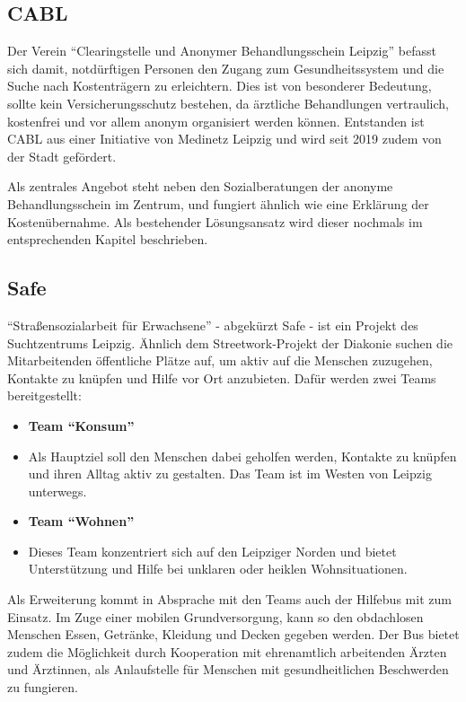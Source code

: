\subsection{CABL}

Der Verein \enquote{Clearingstelle und Anonymer Behandlungsschein Leipzig} befasst sich damit, notdürftigen Personen den Zugang zum Gesundheitssystem und die Suche nach Kostenträgern zu erleichtern. Dies ist von besonderer Bedeutung, sollte kein Versicherungsschutz bestehen, da ärztliche Behandlungen vertraulich, kostenfrei und vor allem anonym organisiert werden können. Entstanden ist CABL aus einer Initiative von Medinetz Leipzig und wird seit 2019 zudem von der Stadt gefördert.

Als zentrales Angebot steht neben den Sozialberatungen der anonyme Behandlungsschein im Zentrum, und fungiert ähnlich wie eine Erklärung der Kostenübernahme. Als bestehender Lösungsansatz wird dieser nochmals im entsprechenden Kapitel beschrieben. \citep{CABL}

\subsection{Safe}

\enquote{Straßensozialarbeit für Erwachsene} - abgekürzt Safe - ist ein Projekt des Suchtzentrums Leipzig. Ähnlich dem Streetwork-Projekt der Diakonie suchen die Mitarbeitenden öffentliche Plätze auf, um aktiv auf die Menschen zuzugehen, Kontakte zu knüpfen und Hilfe vor Ort anzubieten. Dafür werden zwei Teams bereitgestellt:

\begin{itemize}
	\item \textbf{Team \enquote{Konsum}}
	\item[] Als Hauptziel soll den Menschen dabei geholfen werden, Kontakte zu knüpfen und ihren Alltag aktiv zu gestalten. Das Team ist im Westen von Leipzig unterwegs.
	\item \textbf{Team \enquote{Wohnen}}
	\item[] Dieses Team konzentriert sich auf den Leipziger Norden und bietet Unterstützung und Hilfe bei unklaren oder heiklen Wohnsituationen.
\end{itemize}

Als Erweiterung kommt in Absprache mit den Teams auch der Hilfebus mit zum Einsatz. Im Zuge einer mobilen Grundversorgung, kann so den obdachlosen Menschen Essen, Getränke, Kleidung und Decken gegeben werden. Der Bus bietet zudem die Möglichkeit durch Kooperation mit ehrenamtlich arbeitenden Ärzten und Ärztinnen, als Anlaufstelle für Menschen mit gesundheitlichen Beschwerden zu fungieren. \citep{Safe}

